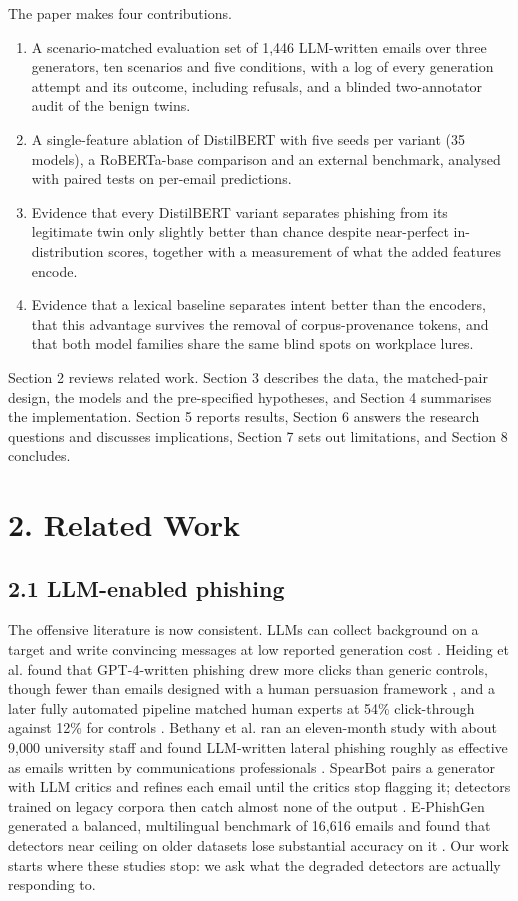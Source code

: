 \documentclass[11pt,letterpaper]{article}
\begin{document}
The paper makes four contributions.

\begin{enumerate}
\item A scenario-matched evaluation set of 1,446 LLM-written emails over three generators, ten scenarios and five conditions, with a log of every generation attempt and its outcome, including refusals, and a blinded two-annotator audit of the benign twins.
\item A single-feature ablation of DistilBERT with five seeds per variant (35 models), a RoBERTa-base comparison and an external benchmark, analysed with paired tests on per-email predictions.
\item Evidence that every DistilBERT variant separates phishing from its legitimate twin only slightly better than chance despite near-perfect in-distribution scores, together with a measurement of what the added features encode.
\item Evidence that a lexical baseline separates intent better than the encoders, that this advantage survives the removal of corpus-provenance tokens, and that both model families share the same blind spots on workplace lures.
\end{enumerate}

Section 2 reviews related work. Section 3 describes the data, the matched-pair design, the models and the pre-specified hypotheses, and Section 4 summarises the implementation. Section 5 reports results, Section 6 answers the research questions and discusses implications, Section 7 sets out limitations, and Section 8 concludes.

\section{2. Related Work}

\subsection{2.1 LLM-enabled phishing}

The offensive literature is now consistent. LLMs can collect background on a target and write convincing messages at low reported generation cost \cite{hazell2023}. Heiding et al. found that GPT-4-written phishing drew more clicks than generic controls, though fewer than emails designed with a human persuasion framework \cite{heiding2024}, and a later fully automated pipeline matched human experts at 54\% click-through against 12\% for controls \cite{heiding2024b}. Bethany et al. ran an eleven-month study with about 9,000 university staff and found LLM-written lateral phishing roughly as effective as emails written by communications professionals \cite{bethany2025}. SpearBot pairs a generator with LLM critics and refines each email until the critics stop flagging it; detectors trained on legacy corpora then catch almost none of the output \cite{qi2025}. E-PhishGen generated a balanced, multilingual benchmark of 16,616 emails and found that detectors near ceiling on older datasets lose substantial accuracy on it \cite{pajola2025}. Our work starts where these studies stop: we ask what the degraded detectors are actually responding to.
\end{document}
